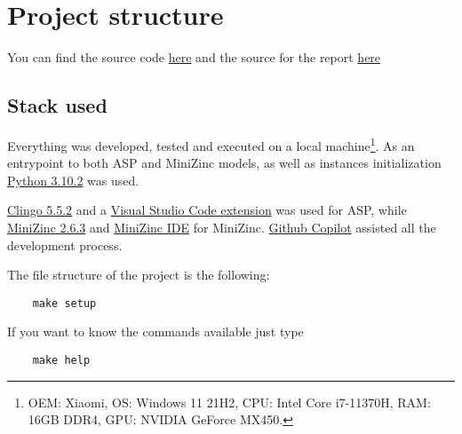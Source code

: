 \section{Project structure}
You can find the source code \href{https://github.com/pinzauti/automated-reasoning}{here} and the source for the report \href{https://github.com/pinzauti/automated-reasoning-report}{here}

\subsection{Stack used}

Everything was developed, tested and executed on a local machine\footnote{OEM: Xiaomi, OS: Windows 11 21H2, CPU: Intel Core i7-11370H, RAM: 16GB DDR4, GPU: NVIDIA GeForce MX450.}. As an entrypoint to both ASP and MiniZinc models, as well as instances initialization \href{https://www.python.org/downloads/release/python-3102/}{Python 3.10.2} was used.

\href{https://github.com/potassco/clingo/releases/tag/v5.5.2}{Clingo 5.5.2} and a \href{https://marketplace.visualstudio.com/items?itemName=abelcour.asp-syntax-highlight}{Visual Studio Code extension} was used for ASP, while \href{https://github.com/MiniZinc/libminizinc/releases/tag/2.6.3}{MiniZinc 2.6.3} and \href{https://www.minizinc.org/ide/}{MiniZinc IDE} for MiniZinc. \href{https://copilot.github.com/}{Github Copilot} assisted all the development process.

The file structure of the project is the following:

\begin{verbatim}
    make setup
\end{verbatim}

If you want to know the commands available just type

\begin{verbatim}
    make help 
\end{verbatim}

